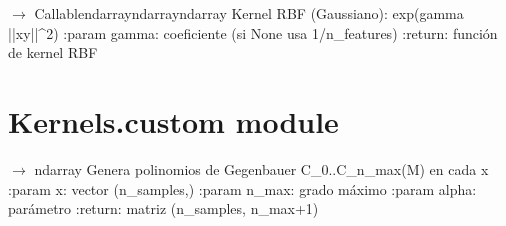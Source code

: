 \documentclass[letterpaper,10pt,english]{sphinxmanual}
\begin{document}

\begin{fulllineitems}
\label{\detokenize{Kernels:Kernels.base.rbf}}
\pysigstartsignatures
\pysiglinewithargsret
{}
{}
{{ $\rightarrow$ Callable\DUrole{p}{{[}}\DUrole{p}{{[}}ndarrayndarray\DUrole{p}{{]}}ndarray\DUrole{p}{{]}}}}
\pysigstopsignatures
\sphinxAtStartPar
Kernel RBF (Gaussiano): exp(\sphinxhyphen{}gamma ||x\sphinxhyphen{}y||\textasciicircum{}2)
:param gamma: coeficiente (si None usa 1/n\_features)
:return: función de kernel RBF

\end{fulllineitems}



\section{Kernels.custom module}
\label{\detokenize{Kernels:module-Kernels.custom}}\label{\detokenize{Kernels:kernels-custom-module}}

\begin{fulllineitems}
\label{\detokenize{Kernels:Kernels.custom.compute_gegenbauer}}
\pysigstartsignatures
\pysiglinewithargsret
{}
{\sphinxparamcomma {}\sphinxparamcomma {}}
{{ $\rightarrow$ ndarray}}
\pysigstopsignatures
\sphinxAtStartPar
Genera polinomios de Gegenbauer C\_0..C\_n\_max(M) en cada x
:param x: vector (n\_samples,)
:param n\_max: grado máximo
:param alpha: parámetro
:return: matriz (n\_samples, n\_max+1)

\end{fulllineitems}
\end{document}
